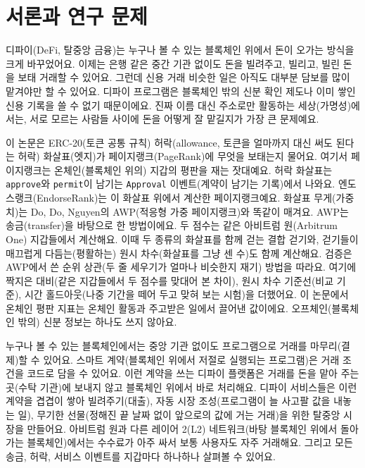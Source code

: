 \chapter{서론과 연구 문제}
\label{ch:introduction}

디파이(DeFi, 탈중앙 금융)는 누구나 볼 수 있는 블록체인 위에서 돈이 오가는 방식을 크게 바꾸었어요. 이제는 은행 같은 중간 기관 없이도 돈을 빌려주고, 빌리고, 빌린 돈을 보태 거래할 수 있어요. 그런데 신용 거래 비슷한 일은 아직도 대부분 담보를 많이 맡겨야만 할 수 있어요. 디파이 프로그램은 블록체인 밖의 신분 확인 제도나 이미 쌓인 신용 기록을 쓸 수 없기 때문이에요. 진짜 이름 대신 주소로만 활동하는 세상(가명성)에서는, 서로 모르는 사람들 사이에 돈을 어떻게 잘 맡길지가 가장 큰 문제예요.

이 논문은 ERC-20(토큰 공통 규칙) 허락(allowance, 토큰을 얼마까지 대신 써도 된다는 허락) 화살표(엣지)가 페이지랭크(PageRank)에 무엇을 보태는지 물어요. 여기서 페이지랭크는 온체인(블록체인 위의) 지갑의 평판을 재는 잣대예요. 허락 화살표는 \texttt{approve}와 \texttt{permit}이 남기는 \texttt{Approval} 이벤트(계약이 남기는 기록)에서 나와요. 엔도스랭크(EndorseRank)는 이 화살표 위에서 계산한 페이지랭크예요. 화살표 무게(가중치)는 Do, Do, Nguyen의 AWP(적응형 가중 페이지랭크)와 똑같이 매겨요. AWP는 송금(transfer)을 바탕으로 한 방법이에요. 두 점수는 같은 아비트럼 원(Arbitrum One) 지갑들에서 계산해요. 이때 두 종류의 화살표를 함께 걷는 결합 걷기와, 걷기들이 매끄럽게 다듬는(평활하는) 원시 차수(화살표를 그냥 센 수)도 함께 계산해요. 검증은 AWP에서 쓴 순위 상관(두 줄 세우기가 얼마나 비슷한지 재기) 방법을 따라요. 여기에 짝지은 대비(같은 지갑들에서 두 점수를 맞대어 본 차이), 원시 차수 기준선(비교 기준), 시간 홀드아웃(나중 기간을 떼어 두고 맞혀 보는 시험)을 더했어요. 이 논문에서 온체인 평판 지표는 온체인 활동과 주고받은 일에서 끌어낸 값이에요. 오프체인(블록체인 밖의) 신분 정보는 하나도 쓰지 않아요.


누구나 볼 수 있는 블록체인에서는 중앙 기관 없이도 프로그램으로 거래를 마무리(결제)할 수 있어요. 스마트 계약(블록체인 위에서 저절로 실행되는 프로그램)은 거래 조건을 코드로 담을 수 있어요. 이런 계약을 쓰는 디파이 플랫폼은 거래를 돈을 맡아 주는 곳(수탁 기관)에 보내지 않고 블록체인 위에서 바로 처리해요. 디파이 서비스들은 이런 계약을 겹겹이 쌓아 빌려주기(대출), 자동 시장 조성(프로그램이 늘 사고팔 값을 내놓는 일), 무기한 선물(정해진 끝 날짜 없이 앞으로의 값에 거는 거래)을 위한 탈중앙 시장을 만들어요. 아비트럼 원과 다른 레이어 2(L2) 네트워크(바탕 블록체인 위에서 돌아가는 블록체인)에서는 수수료가 아주 싸서 보통 사용자도 자주 거래해요. 그리고 모든 송금, 허락, 서비스 이벤트를 지갑마다 하나하나 살펴볼 수 있어요.

